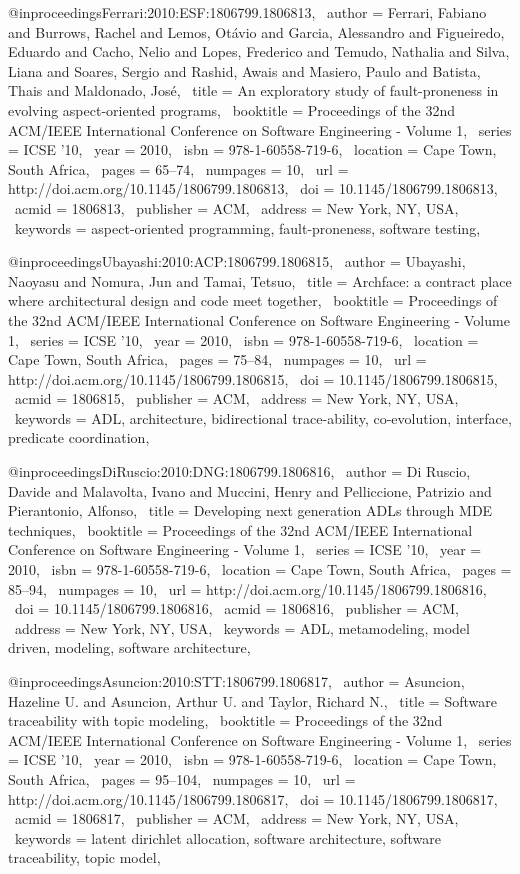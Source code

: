 @inproceedings{Ferrari:2010:ESF:1806799.1806813,
 author = {Ferrari, Fabiano and Burrows, Rachel and Lemos, Ot\'{a}vio and Garcia, Alessandro and Figueiredo, Eduardo and Cacho, Nelio and Lopes, Frederico and Temudo, Nathalia and Silva, Liana and Soares, Sergio and Rashid, Awais and Masiero, Paulo and Batista, Thais and Maldonado, Jos{\'e}},
 title = {An exploratory study of fault-proneness in evolving aspect-oriented programs},
 booktitle = {Proceedings of the 32nd ACM/IEEE International Conference on Software Engineering - Volume 1},
 series = {ICSE '10},
 year = {2010},
 isbn = {978-1-60558-719-6},
 location = {Cape Town, South Africa},
 pages = {65--74},
 numpages = {10},
 url = {http://doi.acm.org/10.1145/1806799.1806813},
 doi = {10.1145/1806799.1806813},
 acmid = {1806813},
 publisher = {ACM},
 address = {New York, NY, USA},
 keywords = {aspect-oriented programming, fault-proneness, software testing},
} 

@inproceedings{Ubayashi:2010:ACP:1806799.1806815,
 author = {Ubayashi, Naoyasu and Nomura, Jun and Tamai, Tetsuo},
 title = {Archface: a contract place where architectural design and code meet together},
 booktitle = {Proceedings of the 32nd ACM/IEEE International Conference on Software Engineering - Volume 1},
 series = {ICSE '10},
 year = {2010},
 isbn = {978-1-60558-719-6},
 location = {Cape Town, South Africa},
 pages = {75--84},
 numpages = {10},
 url = {http://doi.acm.org/10.1145/1806799.1806815},
 doi = {10.1145/1806799.1806815},
 acmid = {1806815},
 publisher = {ACM},
 address = {New York, NY, USA},
 keywords = {ADL, architecture, bidirectional trace-ability, co-evolution, interface, predicate coordination},
} 

@inproceedings{DiRuscio:2010:DNG:1806799.1806816,
 author = {Di Ruscio, Davide and Malavolta, Ivano and Muccini, Henry and Pelliccione, Patrizio and Pierantonio, Alfonso},
 title = {Developing next generation ADLs through MDE techniques},
 booktitle = {Proceedings of the 32nd ACM/IEEE International Conference on Software Engineering - Volume 1},
 series = {ICSE '10},
 year = {2010},
 isbn = {978-1-60558-719-6},
 location = {Cape Town, South Africa},
 pages = {85--94},
 numpages = {10},
 url = {http://doi.acm.org/10.1145/1806799.1806816},
 doi = {10.1145/1806799.1806816},
 acmid = {1806816},
 publisher = {ACM},
 address = {New York, NY, USA},
 keywords = {ADL, metamodeling, model driven, modeling, software architecture},
} 

@inproceedings{Asuncion:2010:STT:1806799.1806817,
 author = {Asuncion, Hazeline U. and Asuncion, Arthur U. and Taylor, Richard N.},
 title = {Software traceability with topic modeling},
 booktitle = {Proceedings of the 32nd ACM/IEEE International Conference on Software Engineering - Volume 1},
 series = {ICSE '10},
 year = {2010},
 isbn = {978-1-60558-719-6},
 location = {Cape Town, South Africa},
 pages = {95--104},
 numpages = {10},
 url = {http://doi.acm.org/10.1145/1806799.1806817},
 doi = {10.1145/1806799.1806817},
 acmid = {1806817},
 publisher = {ACM},
 address = {New York, NY, USA},
 keywords = {latent dirichlet allocation, software architecture, software traceability, topic model},
} 

